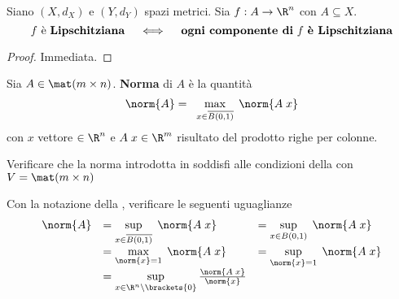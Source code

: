 \begin{proposition}
	Siano $(X,d_X)$ e $(Y,d_Y)$ spazi metrici. Sia $f:A \to \R^n$ con $A \subseteq X$.
	\begin{equation*}
		f \text{ è \textbf{Lipschitziana}} \quad \iff \quad \text{\textbf{ogni componente di} } f \text{ \textbf{è Lipschitziana}}
	\end{equation*}
	\begin{proof}
		Immediata.
	\end{proof}
\end{proposition}

\begin{definition}
	\label{def:norm_matr}
	Sia $A \in \mat (m \times n)$. \textbf{Norma} di $A$ è la quantità
	\[\norm{A} = \;\; \max\limits_{\raisebox{-1ex}{${\scriptstyle x \in \overline{B(0,1)} }$}} \; \norm{A \; x}\]
	con $x$ vettore $\in \R^n$ e $A \; x \in \R^m$ risultato del prodotto righe per colonne.
\end{definition}
\begin{exercise}
	Verificare che la norma introdotta in  soddisfi alle condizioni della  con $V = \mat (m \times n)$
\end{exercise}
\begin{exercise}
	\label{ex:matr_form_alt}
	Con la notazione della , verificare le seguenti uguaglianze
	{
	\renewcommand*{\arraystretch}{1.5} %
	\begin{equation*}
		\begin{array}{rll}
			\norm{A}	& =\sup\limits_{\raisebox{-1ex}{${\scriptstyle x \in \overline{B(0,1)} }$}} \; \norm{A \; x}	& =\sup\limits_{x \in B(0,1)} \; \norm{A \; x}\\
						& =\max\limits_{\norm{x} = 1} \; \norm{A \; x}													& =\sup\limits_{\norm{x} = 1} \; \norm{A \; x}\\
						& =\sup\limits_{x \in \R^n \setminus \brackets{0}} \frac{\norm{A \; x}}{\norm{x}}
		\end{array}
	\end{equation*}
	}
\end{exercise}

